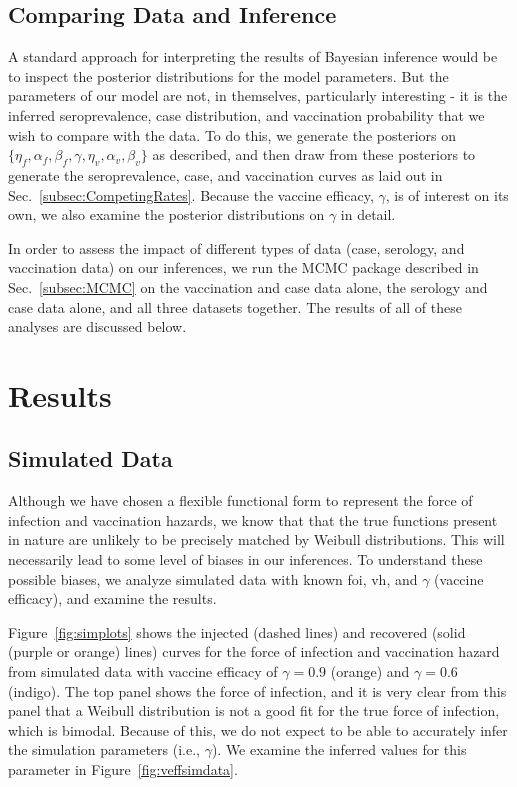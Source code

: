 \documentclass[nofootinbib,aps,pre,twocolumn,superscriptaddress,showkeys,showpacs]{revtex4-1}
\begin{document}
\subsection{Comparing Data and Inference \label{subsec:Comp}}
A standard approach for interpreting the results of Bayesian inference would be to inspect the posterior distributions for the model parameters. But the parameters of our model are not, in themselves, particularly interesting - it is the inferred seroprevalence, case distribution, and vaccination probability that we wish to compare with the data. To do this, we generate the posteriors on $\{\eta_f, \alpha_f, \beta_f, \gamma, \eta_v, \alpha_v, \beta_v\}$ as described, and then draw from these posteriors to generate the seroprevalence, case, and vaccination curves as laid out in Sec.~\ref{subsec:CompetingRates}. Because the vaccine efficacy, $\gamma$, is of interest on its own, we also examine the posterior distributions on $\gamma$ in detail.

In order to assess the impact of different types of data (case, serology, and vaccination data) on our inferences, we run the MCMC package described in Sec.~\ref{subsec:MCMC} on the vaccination and case data alone, the serology and case data alone, and all three datasets together. The results of all of these analyses are discussed below.

\section{Results \label{sec:Results}}
\subsection{Simulated Data \label{subsec:SimDat}}
Although we have chosen a flexible functional form to represent the force of infection and vaccination hazards, we know that that the true functions present in nature are unlikely to be precisely matched by Weibull distributions. This will necessarily lead to some level of biases in our inferences. To understand these possible biases, we analyze simulated data with known foi, vh, and $\gamma$ (vaccine efficacy), and examine the results.  

Figure~\ref{fig:simplots} shows the injected (dashed lines) and recovered (solid (purple or orange) lines) curves for the force of infection and vaccination hazard from simulated data with vaccine efficacy of $\gamma = 0.9$ (orange) and $\gamma = 0.6$ (indigo). The top panel shows the force of infection, and it is very clear from this panel that a Weibull distribution is not a good fit for the true force of infection, which is bimodal.  Because of this, we do not expect to be able to accurately infer the simulation parameters (i.e., $\gamma$). We examine the inferred values for this parameter in Figure~\ref{fig:veffsimdata}.
\end{document}
